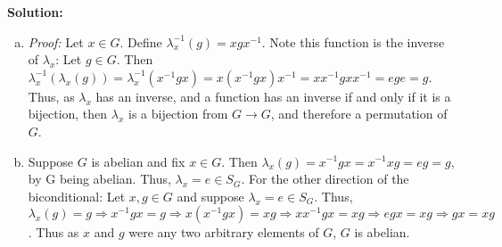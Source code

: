 \documentclass[12pt, letterpaper]{article}
\newenvironment{solution}
    [0]
    {\noindent \textbf{Solution:}} 
    {\vspace{3mm}}
\begin{document}
\begin{solution}
        \begin{enumerate}[(a)]
            \item \emph{Proof:} Let $x \in G$. Define $\lambda_x^{-1}(g) = xgx^{-1}$. Note this function
            is the inverse of $\lambda_x$: Let $g \in G$. Then $\lambda_x^{-1}(\lambda_x(g)) = \lambda_x^{-1}(x^{-1}gx) =
            x(x^{-1}gx)x^{-1} = xx^{-1}gxx^{-1} = ege = g$. Thus, as $\lambda_x$ has an inverse, and a function has an inverse
            if and only if it is a bijection, then $\lambda_x$ is a bijection from $G \rightarrow G$, and therefore a 
            permutation of $G$.

            \item Suppose $G$ is abelian and fix $x \in G$. Then $\lambda_x(g) = x^{-1}g{x} = x^{-1}xg = eg = g$,
            by G being abelian. Thus, $\lambda_x = e \in S_G$. For the other direction of the biconditional: Let $x, g
            \in G$ and suppose $\lambda_x = e \in S_G$. Thus, $\lambda_x(g) = g \Rightarrow x^{-1}gx = g \Rightarrow 
            x(x^{-1}gx) = xg \Rightarrow xx^{-1}gx = xg \Rightarrow egx = xg \Rightarrow gx = xg$. Thus as $x$ and $g$
            were any two arbitrary elements of $G$, $G$ is abelian.

        \end{enumerate}
\end{solution}
\end{document}

